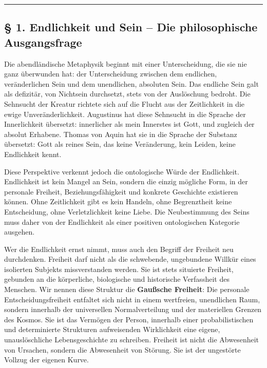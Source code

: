 \documentclass[
  ngerman,
]{article}
\begin{document}
\begin{center}\rule{0.5\linewidth}{0.5pt}\end{center}

\subsection{§ 1. Endlichkeit und Sein -- Die philosophische
Ausgangsfrage}\label{endlichkeit-und-sein-die-philosophische-ausgangsfrage}

Die abendländische Metaphysik beginnt mit einer Unterscheidung, die sie
nie ganz überwunden hat: der Unterscheidung zwischen dem endlichen,
veränderlichen Sein und dem unendlichen, absoluten Sein. Das endliche
Sein galt als defizitär, von Nichtsein durchsetzt, stets von der
Auslöschung bedroht. Die Sehnsucht der Kreatur richtete sich auf die
Flucht aus der Zeitlichkeit in die ewige Unveränderlichkeit. Augustinus
hat diese Sehnsucht in die Sprache der Innerlichkeit übersetzt:
innerlicher als mein Innerstes ist Gott, und zugleich der absolut
Erhabene. Thomas von Aquin hat sie in die Sprache der Substanz
übersetzt: Gott als reines Sein, das keine Veränderung, kein Leiden,
keine Endlichkeit kennt.

Diese Perspektive verkennt jedoch die ontologische Würde der
Endlichkeit. Endlichkeit ist kein Mangel an Sein, sondern die einzig
mögliche Form, in der personale Freiheit, Beziehungsfähigkeit und
konkrete Geschichte existieren können. Ohne Zeitlichkeit gibt es kein
Handeln, ohne Begrenztheit keine Entscheidung, ohne Verletzlichkeit
keine Liebe. Die Neubestimmung des Seins muss daher von der Endlichkeit
als einer positiven ontologischen Kategorie ausgehen.

Wer die Endlichkeit ernst nimmt, muss auch den Begriff der Freiheit neu
durchdenken. Freiheit darf nicht als die schwebende, ungebundene Willkür
eines isolierten Subjekts missverstanden werden. Sie ist stets situierte
Freiheit, gebunden an die körperliche, biologische und historische
Verfassheit des Menschen. Wir nennen diese Struktur die \textbf{Gaußsche
Freiheit}: Die personale Entscheidungsfreiheit entfaltet sich nicht in
einem wertfreien, unendlichen Raum, sondern innerhalb der universellen
Normalverteilung und der materiellen Grenzen des Kosmos. Sie ist das
Vermögen der Person, innerhalb einer probabilistischen und determinierte
Strukturen aufweisenden Wirklichkeit eine eigene, unauslöschliche
Lebensgeschichte zu schreiben. Freiheit ist nicht die Abwesenheit von
Ursachen, sondern die Abwesenheit von Störung. Sie ist der ungestörte
Vollzug der eigenen Kurve.
\end{document}
